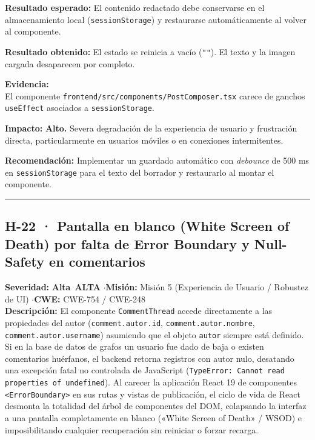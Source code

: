 \documentclass[10pt,a4paper]{article}
\newcommand{\code}[1]{\nolinkurl{#1}}
\newcommand{\badgeAlta}{\colorbox{orange!20}{\textcolor{orange!90!black}{\textbf{\footnotesize Alta}}}}
\begin{document}
\noindent\textbf{Resultado esperado:}
El contenido redactado debe conservarse en el almacenamiento local (\code{sessionStorage}) y restaurarse automáticamente al volver al componente.

\noindent\textbf{Resultado obtenido:}
El estado se reinicia a vacío (\code{""}). El texto y la imagen cargada desaparecen por completo.

\noindent\textbf{Evidencia:}\\
El componente \code{frontend/src/components/PostComposer.tsx} carece de ganchos \code{useEffect} asociados a \code{sessionStorage}.

\noindent\textbf{Impacto:}
\textbf{Alto.} Severa degradación de la experiencia de usuario y frustración directa, particularmente en usuarios móviles o en conexiones intermitentes.

\noindent\textbf{Recomendación:}
Implementar un guardado automático con \textit{debounce} de 500 ms en \code{sessionStorage} para el texto del borrador y restaurarlo al montar el componente.

\vspace{0.8em}
\hrule
\vspace{0.8em}

\subsection{H-22 · Pantalla en blanco (White Screen of Death) por falta de Error Boundary y Null-Safety en comentarios}
\noindent\textbf{Severidad:} \badgeAlta\ \textbf{ALTA} \quad$\cdot$\quad \textbf{Misión:} Misión 5 (Experiencia de Usuario / Robustez de UI) \quad$\cdot$\quad \textbf{CWE:} CWE-754 / CWE-248\\[0.3em]

\noindent\textbf{Descripción:}
El componente \code{CommentThread} accede directamente a las propiedades del autor (\code{comment.autor.id}, \code{comment.autor.nombre}, \code{comment.autor.username}) asumiendo que el objeto \code{autor} siempre está definido. Si en la base de datos de grafos un usuario fue dado de baja o existen comentarios huérfanos, el backend retorna registros con autor nulo, desatando una excepción fatal no controlada de JavaScript (\code{TypeError: Cannot read properties of undefined}).
Al carecer la aplicación React 19 de componentes \code{<ErrorBoundary>} en sus rutas y vistas de publicación, el ciclo de vida de React desmonta la totalidad del árbol de componentes del DOM, colapsando la interfaz a una pantalla completamente en blanco («White Screen of Death» / WSOD) e imposibilitando cualquier recuperación sin reiniciar o forzar recarga.
\end{document}
